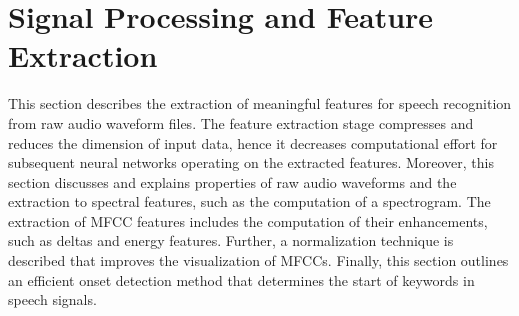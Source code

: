 
\chapter{Signal Processing and Feature Extraction}\label{sec:signal}
This section describes the extraction of meaningful features for speech recognition from raw audio waveform files.
The feature extraction stage compresses and reduces the dimension of input data, hence it decreases computational effort for subsequent neural networks operating on the extracted features.
Moreover, this section discusses and explains properties of raw audio waveforms and the extraction to spectral features, such as the computation of a spectrogram. 
The extraction of MFCC features includes the computation of their enhancements, such as deltas and energy features.
Further, a normalization technique is described that improves the visualization of MFCCs.
Finally, this section outlines an efficient onset detection method that determines the start of keywords in speech signals.





